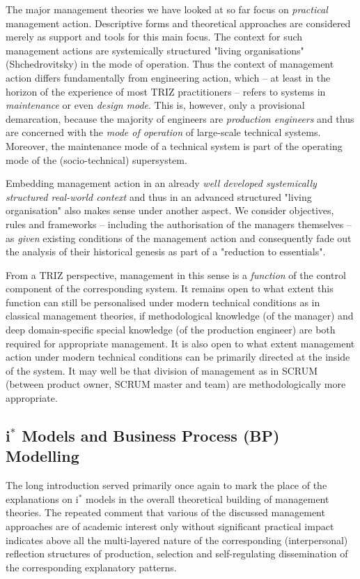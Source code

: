 \documentclass[11pt,a4paper]{article}
\begin{document}
The major management theories we have looked at so far focus on
\emph{practical} management action. Descriptive forms and theoretical
approaches are considered merely as support and tools for this main focus. The
context for such management actions are systemically structured "living
organisations" (Shchedrovitsky) in the mode of operation. Thus the context of
management action differs fundamentally from engineering action, which -- at
least in the horizon of the experience of most TRIZ practitioners -- refers to
systems in \emph{maintenance} or even \emph{design mode}. This is, however,
only a provisional demarcation, because the majority of engineers are
\emph{production engineers} and thus are concerned with the \emph{mode of
  operation} of large-scale technical systems. Moreover, the maintenance mode
of a technical system is part of the operating mode of the (socio-technical)
supersystem.

Embedding management action in an already \emph{well developed systemically
  structured real-world context} and thus in an advanced structured "living
organisation" also makes sense under another aspect. We consider objectives,
rules and frameworks -- including the authorisation of the managers themselves
-- as \emph{given} existing conditions of the management action and
consequently fade out the analysis of their historical genesis as part of a
"reduction to essentials".

From a TRIZ perspective, management in this sense is a \emph{function} of the
control component of the corresponding system. It remains open to what extent
this function can still be personalised under modern technical conditions as
in classical management theories, if methodological knowledge (of the manager)
and deep domain-specific special knowledge (of the production engineer) are
both required for appropriate management. It is also open to what extent
management action under modern technical conditions can be primarily directed
at the inside of the system. It may well be that division of management as in
SCRUM (between product owner, SCRUM master and team) are methodologically more
appropriate.

\subsection{i$^\ast$ Models and Business Process (BP) Modelling}

The long introduction served primarily once again to mark the place of the
explanations on i$^\ast$ models in the overall theoretical building of
management theories.  The repeated comment that various of the discussed
management approaches are of academic interest only without significant
practical impact indicates above all the multi-layered nature of the
corresponding (interpersonal) reflection structures of production, selection
and self-regulating dissemination of the corresponding explanatory patterns.
\end{document}
